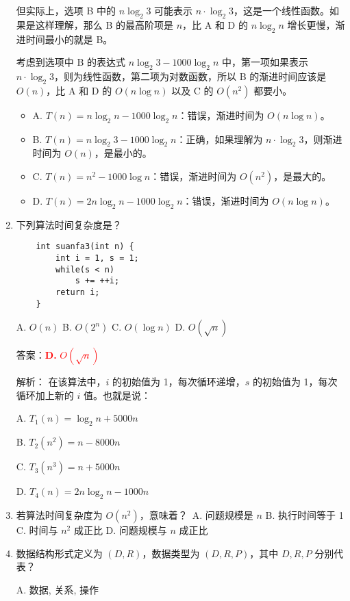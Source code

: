 \documentclass[lang=cn,newtx,10pt,scheme=chinese]{../../../elegantbook}
\begin{document}
\begin{enumerate}
    但实际上，选项 B 中的 $n\log_2 3$ 可能表示 $n \cdot \log_2 3$，这是一个线性函数。如果是这样理解，那么 B 的最高阶项是 $n$，比 A 和 D 的 $n\log_2 n$ 增长更慢，渐进时间最小的就是 B。

    考虑到选项中 B 的表达式 $n\log_2 3 -1000\log_2 n$ 中，第一项如果表示 $n \cdot \log_2 3$，则为线性函数，第二项为对数函数，所以 B 的渐进时间应该是 $O(n)$，比 A 和 D 的 $O(n\log n)$ 以及 C 的 $O(n^2)$ 都要小。

    \begin{itemize}
        \item A. $T(n)=n\log_2 n -1000\log_2 n$：错误，渐进时间为 $O(n\log n)$。
        \item B. $T(n)=n\log_2 3 -1000\log_2 n$：正确，如果理解为 $n \cdot \log_2 3$，则渐进时间为 $O(n)$，是最小的。
        \item C. $T(n)=n^2 -1000\log n$：错误，渐进时间为 $O(n^2)$，是最大的。
        \item D. $T(n)=2n\log_2 n -1000\log_2 n$：错误，渐进时间为 $O(n\log n)$。
    \end{itemize}

    \item 下列算法时间复杂度是？
    \begin{verbatim}
    int suanfa3(int n) {
        int i = 1, s = 1;
        while(s < n)
            s += ++i;
        return i;
    }
    \end{verbatim}
    A. $O(n)$ \quad B. $O(2^n)$ \quad C. $O(\log n)$ \quad D. $O(\sqrt{n})$

    答案：\textcolor{red}{\textbf{D.} $O(\sqrt{n})$}

    解析：
    在该算法中，$i$ 的初始值为 1，每次循环递增，$s$ 的初始值为 1，每次循环加上新的 $i$ 值。也就是说：
    
    A. $T_1(n) = \log_2 n + 5000n$ \quad
    
    B. $T_2(n^2) = n - 8000n$ \

    C. $T_3(n^3) = n + 5000n$ \quad 
    
    D. $T_4(n) = 2n\log_2 n -1000n$

    \item 若算法时间复杂度为 $O(n^2)$，意味着？\
    A. 问题规模是 $n$ \quad B. 执行时间等于 1 \quad C. 时间与 $n^2$ 成正比 \quad D. 问题规模与 $n$ 成正比

    \item 数据结构形式定义为 $(D, R)$，数据类型为 $(D, R, P)$，其中 $D, R, P$ 分别代表？\
    
    A. 数据, 关系, 操作 \quad 
    

\end{enumerate}
\end{document}
